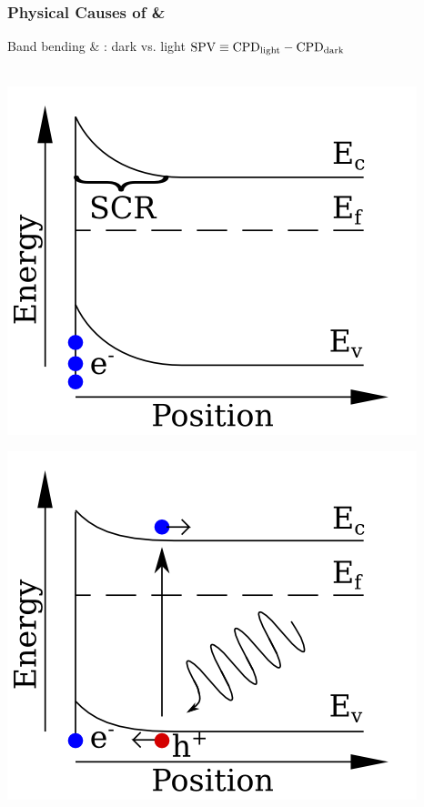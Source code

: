 \documentclass{beamer}
\begin{document}
\begin{frame}
\frametitle{Physical Causes of \cpd{} \& \spv{}}
\begin{block}{Band bending \& \spv{}: dark vs. light}
\centering
$\text{SPV} \equiv \text{CPD}_{\text{light}} - \text{CPD}_{\text{dark}}$\\[-8pt]\hrulefill\\[-5pt]
\begin{minipage}{0.45\linewidth}
\centering
	\includegraphics[width=1\linewidth]{./figs/pres/bb-dark}
\end{minipage}
\hfill
\begin{minipage}{0.45\linewidth}
\centering
	\includegraphics[width=1\linewidth]{./figs/pres/bb-light}
\end{minipage}
\end{block}\end{frame}
\end{document}
